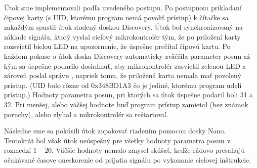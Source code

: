 Útok sme implementovali podľa uvedeného postupu. Po postupnom prikladaní čipovej karty (s UID, ktorému program nemá povoliť prístup) k čítačke sa zakaždým spustil útok riadený doskou Discovery. Útok bol synchronizovaný na základe signálu, ktorý vyslal cieľový mikrokontrolér tým, že po priložení karty rozsvietil bielou LED na upozornenie, že úspešne prečítal čipovú kartu. Po každom pokuse o útok doska Discovery automaticky zväčšila parameter posun až kým sa úspešne podarilo dosiahnuť, aby mikrokontrolér zasvietil zelenou LED a zároveň poslal správu , napriek tomu, že priložená karta nemala mať povolený prístup. (UID bolo rôzne od 0x348BD1A3 čo je jediné, ktorému program udelí prístup.) Hodnoty parametra posun, pri ktorých sa útok úspešne podaril boli 31 a 32. Pri menšej, alebo väčšej hodnote buď program prístup zamietol (bez známok poruchy), alebo zlyhal a mikrokontrolér sa reštartoval.

Následne sme sa pokúsili útok zopakovať riadením pomocou dosky Nano. Tentokrát bol však útok neúspešný pre všetky hodnoty parametra posun v rozmedzí 1 -- 20. Väčšie hodnoty nemalo zmysel skúšať, keďže rádovo presahujú očakávané časove oneskorenie od prijatia signálu po vykonanie cieľovej inštrukcie.